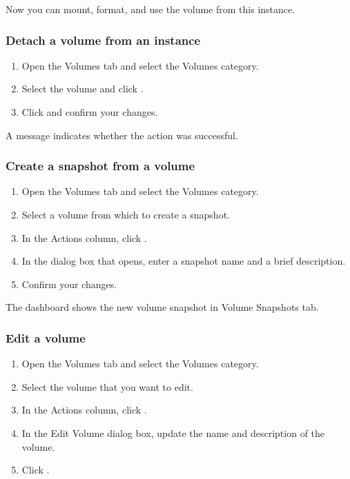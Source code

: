 Now you can mount, format, and use the volume from this instance.

\subsubsection{Detach a volume from an instance}\label{detach-a-volume-from-an-instance}
\begin{enumerate}
\item Open the Volumes tab and select the Volumes category.
  \item Select the volume and click .
  \item Click  and confirm your changes.
  \end{enumerate}

A message indicates whether the action was successful.

\subsubsection{Create a snapshot from a
  volume}\label{create-a-snapshot-from-a-volume}
\begin{enumerate}
\item Open the Volumes tab and select the Volumes category.
\item Select a volume from which to create a snapshot.
\item In the Actions column, click .
\item In the dialog box that opens, enter a snapshot name and a brief
  description.
\item Confirm your changes.
\end{enumerate}

The dashboard shows the new volume snapshot in Volume Snapshots tab.

\subsubsection{Edit a volume}\label{edit-a-volume}
\begin{enumerate}
\def\labelenumi{\arabic{enumi}.}
\item Open the Volumes tab and select the Volumes category.
\item Select the volume that you want to edit.
\item In the Actions column, click .
\item In the Edit Volume dialog box, update the name and description
  of the volume.
\item Click .
\end{enumerate}

